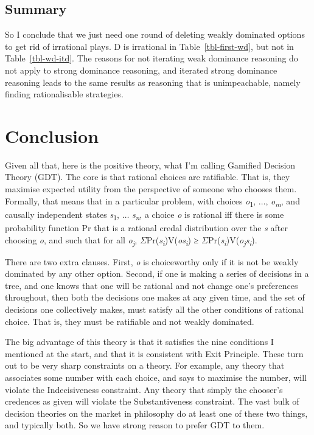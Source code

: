 \documentclass[
  12pt,
  letterpaper,
  DIV=11,
  numbers=noendperiod]{scrreprt}
\begin{document}
\section{Summary}\label{sec-weak-summary}

So I conclude that we just need one round of deleting weakly dominated
options to get rid of irrational plays. D is irrational in
Table~\ref{tbl-first-wd}, but not in Table~\ref{tbl-wd-itd}. The reasons
for not iterating weak dominance reasoning do not apply to strong
dominance reasoning, and iterated strong dominance reasoning leads to
the same results as reasoning that is unimpeachable, namely finding
rationalisable strategies.


\chapter{Conclusion}\label{sec-conclusion}

Given all that, here is the positive theory, what I'm calling Gamified
Decision Theory (GDT). The core is that rational choices are ratifiable.
That is, they maximise expected utility from the perspective of someone
who chooses them. Formally, that means that in a particular problem,
with choices \emph{o}\textsubscript{1}, \(\dots\),
\emph{o\textsubscript{m}}, and causally independent states
\emph{s}\textsubscript{1}, \(\dots\) \emph{s\textsubscript{n}}, a choice
\emph{o} is rational iff there is some probability function Pr that is a
rational credal distribution over the \emph{s} after choosing \emph{o},
and such that for all \emph{o\textsubscript{j}},
\(\Sigma\)Pr(\emph{s\textsubscript{i}})V(\emph{os\textsubscript{i}}) ≥
\(\Sigma\)Pr(\emph{s\textsubscript{i}})V(\emph{o\textsubscript{j}s\textsubscript{i}}).

There are two extra clauses. First, \emph{o} is choiceworthy only if it
is not be weakly dominated by any other option. Second, if one is making
a series of decisions in a tree, and one knows that one will be rational
and not change one's preferences throughout, then both the decisions one
makes at any given time, and the set of decisions one collectively
makes, must satisfy all the other conditions of rational choice. That
is, they must be ratifiable and not weakly dominated.

The big advantage of this theory is that it satisfies the nine
conditions I mentioned at the start, and that it is consistent with Exit
Principle. These turn out to be very sharp constraints on a theory. For
example, any theory that associates some number with each choice, and
says to maximise the number, will violate the Indecisiveness constraint.
Any theory that simply the chooser's credences as given will violate the
Substantiveness constraint. The vast bulk of decision theories on the
market in philosophy do at least one of these two things, and typically
both. So we have strong reason to prefer GDT to them.
\end{document}
